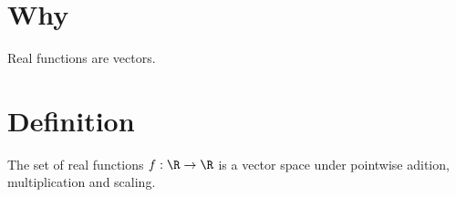 
    \section*{Why}


Real functions are vectors.

    \section*{Definition}


The set of real functions $f: \R  \to \R $ is a vector space under pointwise adition, multiplication and scaling.

\blankpage
